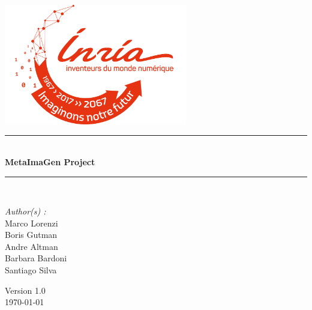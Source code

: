 \documentclass[a4paper,12pt]{book}
\theoremstyle{break}
\begin{document}

\begin{titlepage}
\begin{center}

\includegraphics[width=0.6\textwidth]{logo-isae-supaero}\\[1cm]



\rule{\linewidth}{0.5mm} \\[0.4cm]
{ \huge \bfseries MetaImaGen Project \\[0.4cm] }
\rule{\linewidth}{0.5mm} \\[1.5cm]

\noindent
\begin{minipage}{0.4\textwidth}
  \begin{flushleft} \large
    \emph{Author(s) :}\\
    Marco Lorenzi \\
    Boris Gutman \\
    Andre Altman \\
    Barbara Bardoni \\
    Santiago Silva\\
  \end{flushleft}
\end{minipage}%

\vfill

{\large Version 1.0\\ \today}

\end{center}
\end{titlepage}
\end{document}
